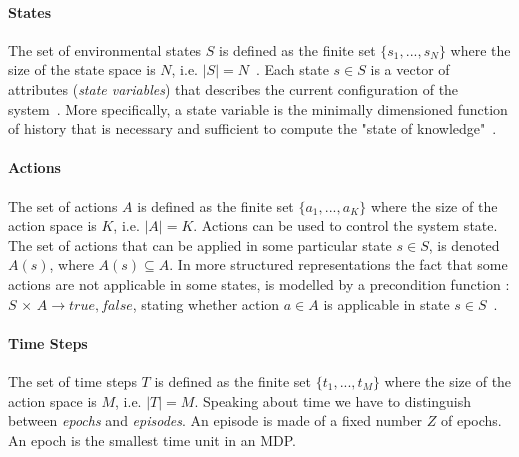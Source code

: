 \paragraph{States} The set of environmental states $S$ is defined as the finite set $\{s_1, . . . , s_N\}$ where the size of the state space is $N$, i.e. $|S| = N$~\cite{wiering2012reinforcement}. Each state ${s \in S}$ is a vector of attributes (\textit{state variables}) that describes the current configuration of the system~\cite{Nevmyvaka}. More specifically, a state variable is the minimally dimensioned function of history that is necessary and sufficient to compute the "state of knowledge"~\cite{Powell}.

\paragraph{Actions} The set of actions $A$ is defined as the finite set $\{a_1, . . . ,a_K\}$ where the size of the action space is $K$, i.e. $|A| = K$. Actions can be used to control the system state. The set of actions that can be applied in some particular state $s \in S$, is denoted $A(s)$, where $A(s) \subseteq A$. In more structured representations the fact that some actions are not applicable in some states, is modelled by a precondition function : $S$ × $A→{true,false}$, stating whether action $a \in A$ is applicable in state $s \in S$~\cite{wiering2012reinforcement}.

\paragraph{Time Steps} The set of time steps $T$ is defined as the finite set $\{t_1, . . . ,t_M\}$ where the size of the action space is $M$, i.e. $|T| = M$. Speaking about time we have to distinguish between \textit{epochs} and \textit{episodes}. An episode is made of a fixed number $Z$ of epochs. An epoch is the smallest time unit in an MDP.

